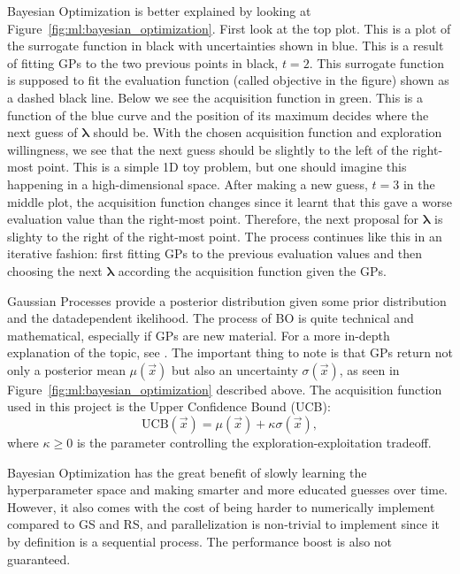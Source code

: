 Bayesian Optimization is better explained by looking at Figure~\ref{fig:ml:bayesian_optimization}. First look at the top plot. This is a plot of the surrogate function in black with uncertainties shown in blue. This is a result of fitting GPs to the two previous points in black, $t=2$. This surrogate function is supposed to fit the evaluation function (called objective in the figure) shown as a dashed black line. Below we see the acquisition function in green. This is a function of the blue curve and the position of its maximum decides where the next guess of $\bm{\lambda}$ should be. With the chosen acquisition function and exploration willingness, we see that the next guess should be slightly to the left of the right-most point. This is a simple 1D toy problem, but one should imagine this happening in a high-dimensional space. After making a new guess, $t=3$ in the middle plot, the acquisition function changes since it learnt that this gave a worse evaluation value than the right-most point. Therefore, the next proposal for $\bm{\lambda}$ is slighty to the right of the right-most point. The process continues like this in an iterative fashion: first fitting GPs to the previous evaluation values and then choosing the next $\bm{\lambda}$ according the acquisition function given the GPs. 

Gaussian Processes provide a posterior distribution given some prior distribution and the datadependent ikelihood. The process of BO is quite technical and mathematical, especially if GPs are new material. For a more in-depth explanation of the topic, see \citet{brochuTutorialBayesianOptimization2010}. The important thing to note is that GPs return not only a posterior mean $\mu(\vec{x})$ but also an uncertainty $\sigma(\vec{x})$, as seen in Figure~\ref{fig:ml:bayesian_optimization} described above. The acquisition function used in this project is the Upper Confidence Bound (UCB):
\begin{equation}
  \mathrm{UCB}(\vec{x}) = \mu(\vec{x}) + \kappa \sigma(\vec{x}),
\end{equation}
where $\kappa \geq 0$ is the parameter controlling the exploration-exploitation tradeoff. 

Bayesian Optimization has the great benefit of slowly learning the hyperparameter space and making smarter and more educated guesses over time. However, it also comes with the cost of being harder to numerically implement compared to GS and RS, and parallelization is non-trivial to implement since it by definition is a sequential process. The performance boost is also not guaranteed. 

